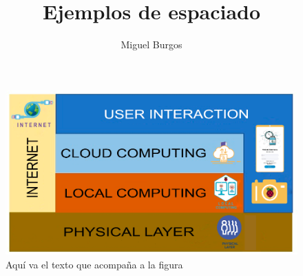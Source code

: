\documentclass[11pt,a4paper]{book}
\author{Miguel Burgos}
\title{Ejemplos de espaciado}
\begin{document}
\begin{figure}
	\centering\includegraphics[width=.8\textwidth]{architecture.png}
	\caption{Aquí va el texto que acompaña a la figura}
	\label{fig:cariotipo}
\end{figure}
\end{document}
